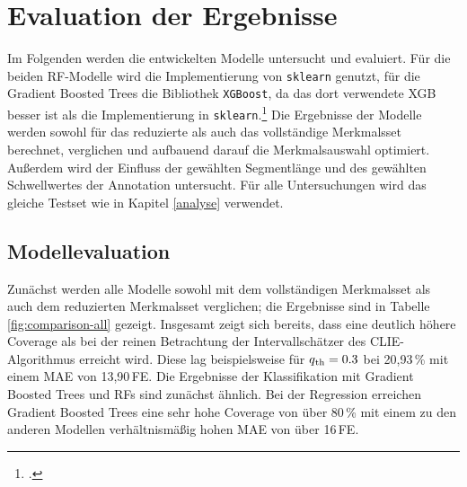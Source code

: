\chapter{Evaluation der Ergebnisse}\label{evaluation}

Im Folgenden werden die entwickelten Modelle untersucht und evaluiert. Für die beiden \acl{RF}-Modelle wird die Implementierung von \texttt{sklearn} genutzt, für die Gradient Boosted Trees die Bibliothek \texttt{XGBoost}, da das dort verwendete \acl{XGB} besser ist als die Implementierung in \texttt{sklearn}.\footcite[Kapitel 10]{Harrison2019} Die Ergebnisse der Modelle werden sowohl für das reduzierte als auch das vollständige Merkmalsset berechnet, verglichen und aufbauend darauf die Merkmalsauswahl optimiert. Außerdem wird der Einfluss der gewählten Segmentlänge und des gewählten Schwellwertes der Annotation untersucht. Für alle Untersuchungen wird das gleiche Testset wie in Kapitel \ref{analyse} verwendet.

\section{Modellevaluation} %

Zunächst werden alle Modelle sowohl mit dem vollständigen Merkmalsset als auch dem reduzierten Merkmalsset verglichen; die Ergebnisse sind in Tabelle \ref{fig:comparison-all} gezeigt. Insgesamt zeigt sich bereits, dass eine deutlich höhere Coverage als bei der reinen Betrachtung der Intervallschätzer des CLIE-Algorithmus erreicht wird. Diese lag beispielsweise für $q\textsubscript{th} = 0.3$ bei 20,93\,\% mit einem \ac{MAE} von 13,90\,\si{FE}. Die Ergebnisse der Klassifikation mit Gradient Boosted Trees und \acl{RF}s sind zunächst ähnlich. Bei der Regression erreichen Gradient Boosted Trees eine sehr hohe Coverage von über 80\,\% mit einem zu den anderen Modellen verhältnismäßig hohen \ac{MAE} von über 16\,\si{FE}.


